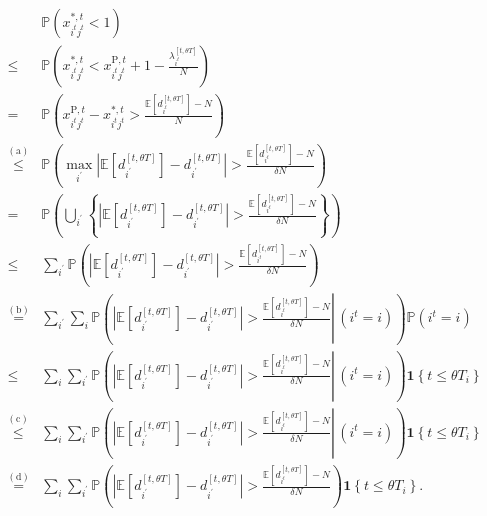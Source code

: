 $$
\begin{aligned}
& \mathbb{P}\left(x_{i^{t}j^{t}}^{*,t} <1\right) \\
\leqslant & \mathbb{P}\left(x_{i^{t}j^{t}}^{*,t} < x_{i^{t}j^{t}}^{\mathrm{P}, t}+1-\frac{\lambda_{i^t}^{[t, \theta T]}}{N}\right) \\
= & \mathbb{P}\left(x_{i^{t}j^{t}}^{\mathrm{P}, t} - x_{i^{t}j^{t}}^{*,t} > \frac{\mathbb{E}\left[d_{i^t}^{[t, \theta T]}\right]-N}{N}\right) \\
\stackrel{(\mathrm{a})}{\leqslant} & \mathbb{P}\left(\max_{i^{\prime}}\left|\mathbb{E}\left[d_{i^{\prime}}^{[t, \theta T]}\right]-d_{i^{\prime}}^{[t, \theta T]}\right|> \frac{\mathbb{E}\left[d_{i^t}^{[t, \theta T]}\right]-N}{\delta N} \right) \\
= & \mathbb{P}\left(\bigcup_{i^{\prime}}\left\{\left|\mathbb{E}\left[d_{i^{\prime}}^{[t, \theta T]}\right] - d_{i^{\prime}}^{[t, \theta T]}\right|> \frac{\mathbb{E}\left[d_{i^t}^{[t, \theta T]}\right]-N}{\delta N} \right\}\right) \\
\leqslant & \sum_{i^{\prime}} \mathbb{P}\left(\left|\mathbb{E}\left[d_{i^{\prime}}^{[t, \theta T]}\right]-d_{i^{\prime}}^{[t, \theta T]}\right|> \frac{\mathbb{E}\left[d_{i^t}^{[t, \theta T]}\right]-N}{\delta N}\right) \\
\stackrel{(\mathrm{b})}{=} & \sum_{i^{\prime}} \sum_{i} \mathbb{P}\left(\left.\left|\mathbb{E}\left[d_{i^{\prime}}^{[t, \theta T]}\right]-d_{i^{\prime}}^{[t, \theta T]}\right| > \frac{\mathbb{E}\left[d_{i^t}^{[t, \theta T]}\right]-N}{\delta N} \right\rvert\,\left(i^t = i\right) \right) \mathbb{P}\left(i^t = i \right)  \\
\leqslant & \sum_{i} \sum_{i^{\prime}} \mathbb{P}\left(\left.\left|\mathbb{E}\left[d_{i^{\prime}}^{[t, \theta T]}\right]-d_{i^{\prime}}^{[t, \theta T]}\right| > \frac{\mathbb{E}\left[d_{i^t}^{[t, \theta T]}\right]-N}{\delta N} \right\rvert\,\left(i^t = i\right) \right) \bm{1}\left\{t \leqslant \theta T_{i}\right\} \\
\stackrel{(\mathrm{c})}{\leqslant} & \sum_{i} \sum_{i^{\prime}} \mathbb{P}\left(\left.\left|\mathbb{E}\left[d_{i^{\prime}}^{[t, \theta T]}\right]-d_{i^{\prime}}^{[t, \theta T]}\right| > \frac{\mathbb{E}\left[d_{i^t}^{[t, \theta T]}\right]-N}{\delta N} \right\rvert\,\left(i^t = i\right) \right) \bm{1}\left\{t \leqslant \theta T_{i}\right\} \\
\stackrel{(\mathrm{d})}{=} & \sum_{i} \sum_{i^{\prime}} \mathbb{P}\left(\left|\mathbb{E}\left[d_{i^{\prime}}^{[t, \theta T]}\right]-d_{i^{\prime}}^{[t, \theta T]}\right| > \frac{\mathbb{E}\left[d_{i^t}^{[t, \theta T]}\right]-N}{\delta N} \right) \bm{1}\left\{t \leqslant \theta T_{i}\right\}.
\end{aligned}
$$




